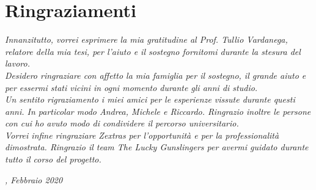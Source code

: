 
\cleardoublepage
{}
{}

\bigskip

\begingroup
\let\clearpage\relax
\let\cleardoublepage\relax
\let\cleardoublepage\relax

\chapter*{Ringraziamenti}

\noindent \textit{Innanzitutto, vorrei esprimere la mia gratitudine al Prof. Tullio Vardanega, relatore della mia tesi, per l'aiuto e il sostegno fornitomi durante la stesura del lavoro.}\\

\noindent \textit{Desidero ringraziare con affetto la mia famiglia per il sostegno, il grande aiuto e per essermi stati vicini in ogni momento durante gli anni di studio.}\\

\noindent \textit{Un sentito rigraziamento i miei amici per le esperienze vissute durante questi anni. In particolar modo Andrea, Michele e Riccardo. Ringrazio inoltre le persone con cui ho avuto modo di condividere il percorso universitario.}\\

\noindent \textit{Vorrei infine ringraziare Zextras per l'opportunità e per la professionalità dimostrata. Ringrazio il team The Lucky Gunslingers per avermi guidato durante tutto il corso del progetto.}\\

\bigskip

\noindent\textit{\myLocation, Febbraio 2020}
\hfill \myName

\endgroup

